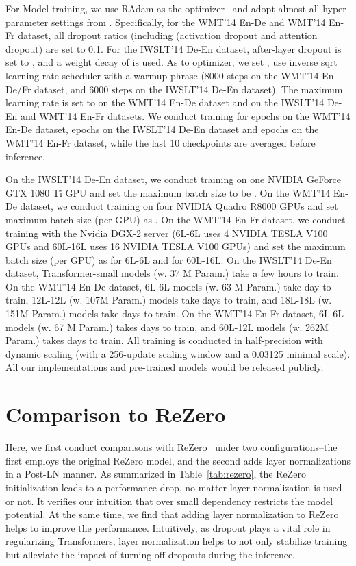 For Model training, we use RAdam as the optimizer~\cite{Liu2019OnTV} and adopt almost all hyper-parameter settings from \citet{lu2020understanding}.
Specifically, for the WMT'14 En-De and WMT'14 En-Fr dataset, all dropout ratios (including (activation dropout and attention dropout) are set to 0.1. 
For the IWSLT'14 De-En dataset, after-layer dropout is set to , and a weight decay of  is used. 
As to optimizer, we set ,  use inverse sqrt learning rate scheduler with a warmup phrase (8000 steps on the WMT'14 En-De/Fr dataset, and 6000 steps on the IWSLT'14 De-En dataset). 
The maximum learning rate is set to  on the WMT'14 En-De dataset and  on the IWSLT'14 De-En and WMT'14 En-Fr datasets. 
We conduct training for  epochs on the WMT'14 En-De dataset,  epochs on the IWSLT'14 De-En dataset and  epochs on the WMT'14 En-Fr dataset, while the last 10 checkpoints are averaged before inference. 

On the IWSLT'14 De-En dataset, we conduct training on one NVIDIA GeForce GTX 1080 Ti GPU and set the maximum batch size to be . 
On the WMT'14 En-De dataset, we conduct training on four NVIDIA Quadro R8000 GPUs and set maximum batch size (per GPU) as . 
On the WMT'14 En-Fr dataset, we conduct training with the Nvidia DGX-2 server (6L-6L uses 4 NVIDIA TESLA V100 GPUs and 60L-16L uses 16 NVIDIA TESLA V100 GPUs) and set the maximum batch size (per GPU) as  for 6L-6L and  for 60L-16L. 
On the IWSLT'14 De-En dataset, Transformer-small models (w. 37 M Param.) take a few hours to train.
On the WMT'14 En-De dataset, 6L-6L models (w. 63 M Param.) take  day to train, 
12L-12L (w. 107M Param.) models take  days to train, 
and 18L-18L (w. 151M Param.) models take  days to train. 
On the WMT'14 En-Fr dataset, 6L-6L models (w. 67 M Param.) takes  days to train, and 60L-12L models (w. 262M Param.) takes  days to train. 
All training is conducted in half-precision with dynamic scaling (with a 256-update scaling window and a 0.03125 minimal scale).
All our implementations and pre-trained models would be released publicly. 

\section{Comparison to ReZero}
\label{appendix:rezero}

Here, we first conduct comparisons with ReZero~\cite{Bachlechner2020ReZeroIA} under two configurations--the first employs the original ReZero model, and the second adds layer normalizations in a Post-LN manner. 
As summarized in Table~\ref{tab:rezero}, the ReZero initialization leads to a performance drop, no matter layer normalization is used or not. 
It verifies our intuition that over small dependency restricts the model potential. 
At the same time, we find that adding layer normalization to ReZero helps to improve the performance. 
Intuitively, as dropout plays a vital role in regularizing Transformers, layer normalization helps to not only stabilize training but alleviate the impact of turning off dropouts during the inference. 

